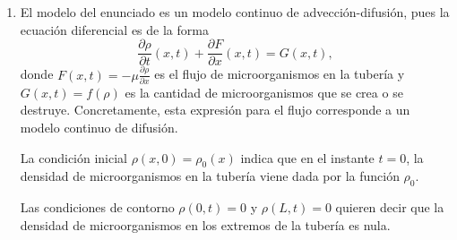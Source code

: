 \documentclass[11pt]{report}
\begin{document}
\begin{solution}
    \hfill
    \begin{enumerate}
        \item El modelo del enunciado es un modelo continuo de advección-difusión, pues la ecuación diferencial es de la forma
        \[\frac{\partial\rho}{\partial t}(x,t) + \frac{\partial F}{\partial x}(x,t) = G(x,t),\]
        donde $F(x,t) = -\mu\frac{\partial \rho}{\partial x}$ es el flujo de microorganismos en la tubería y $G(x,t) = f(\rho)$ es la cantidad de microorganismos que se crea o se destruye. Concretamente, esta expresión para el flujo corresponde a un modelo continuo de difusión.

        La condición inicial $\rho(x,0) = \rho_0(x)$ indica que en el instante $t = 0$, la densidad de microorganismos en la tubería viene dada por la función $\rho_0$. 
        
        Las condiciones de contorno $\rho(0,t) = 0$ y $\rho(L,t) = 0$ quieren decir que la densidad de microorganismos en los extremos de la tubería es nula.


\end{enumerate}
\end{solution}
\end{document}
